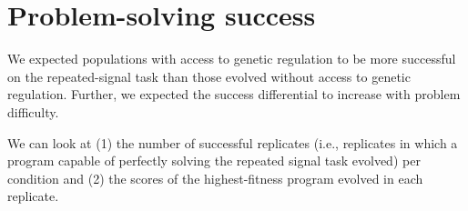 \documentclass[
]{book}
\newenvironment{Shaded}{\begin{snugshade}}{\end{snugshade}}
\newcommand{\CommentTok}[1]{\textcolor[rgb]{0.56,0.35,0.01}{\textit{#1}}}
\newcommand{\DataTypeTok}[1]{\textcolor[rgb]{0.13,0.29,0.53}{#1}}
\newcommand{\DecValTok}[1]{\textcolor[rgb]{0.00,0.00,0.81}{#1}}
\newcommand{\KeywordTok}[1]{\textcolor[rgb]{0.13,0.29,0.53}{\textbf{#1}}}
\newcommand{\NormalTok}[1]{#1}
\newcommand{\OperatorTok}[1]{\textcolor[rgb]{0.81,0.36,0.00}{\textbf{#1}}}
\newcommand{\StringTok}[1]{\textcolor[rgb]{0.31,0.60,0.02}{#1}}
\begin{document}
\begin{Shaded}
\end{Shaded}

\hypertarget{problem-solving-success}{%
\section{Problem-solving success}\label{problem-solving-success}}

We expected populations with access to genetic regulation to be more successful on the repeated-signal task than those evolved without access to genetic regulation.
Further, we expected the success differential to increase with problem difficulty.

We can look at
(1) the number of successful replicates (i.e., replicates in which a program capable of perfectly solving the repeated signal task evolved) per condition
and (2) the scores of the highest-fitness program evolved in each replicate.
\end{document}
